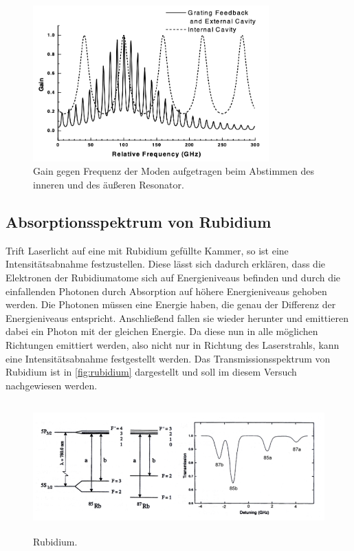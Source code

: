 \begin{figure}[H]
    \centering
    \includegraphics[height=6cm]{content/pics/moden.png}
    \caption{Gain gegen Frequenz der Moden aufgetragen beim Abstimmen des inneren und des äußeren Resonator. 
    \cite{V60}}
    \label{fig:mode}
\end{figure}

\subsection{Absorptionsspektrum von Rubidium}
Trift Laserlicht auf eine mit Rubidium gefüllte Kammer, so ist eine Intensitätsabnahme festzustellen. Diese lässt
sich dadurch erklären, dass die Elektronen der Rubidiumatome sich auf Energieniveaus befinden und durch die
einfallenden Photonen durch Absorption auf höhere Energieniveaus gehoben werden.
Die Photonen müssen eine Energie haben, die genau der Differenz der Energieniveaus entspricht. Anschließend fallen
sie wieder herunter und emittieren dabei ein Photon mit der gleichen Energie. Da diese nun in alle möglichen
Richtungen emittiert werden, also nicht nur in Richtung des Laserstrahls, kann eine Intensitätsabnahme festgestellt werden.
Das Transmissionsspektrum von Rubidium ist in \autoref{fig:rubidium} dargestellt und soll im diesem Versuch nachgewiesen werden.

\begin{figure}[H]
    \centering
    \includegraphics[height=5cm]{content/pics/Rubidium.png}
    \caption{Rubidium. \cite{V60}}
    \label{fig:rubidium}
\end{figure}

